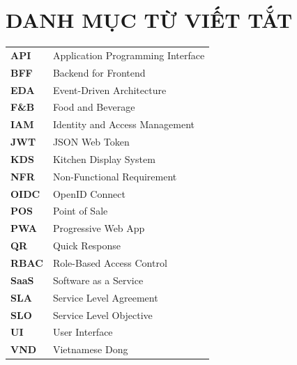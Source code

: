 \chapter*{DANH MỤC TỪ VIẾT TẮT}

\begin{longtable}{>{\bfseries}p{3cm}p{10cm}}
API & Application Programming Interface \\
BFF & Backend for Frontend \\
EDA & Event-Driven Architecture \\
F\&B & Food and Beverage \\
IAM & Identity and Access Management \\
JWT & JSON Web Token \\
KDS & Kitchen Display System \\
NFR & Non-Functional Requirement \\
OIDC & OpenID Connect \\
POS & Point of Sale \\
PWA & Progressive Web App \\
QR & Quick Response \\
RBAC & Role-Based Access Control \\
SaaS & Software as a Service \\
SLA & Service Level Agreement \\
SLO & Service Level Objective \\
UI & User Interface \\
VND & Vietnamese Dong \\
\end{longtable}

\cleardoublepage
